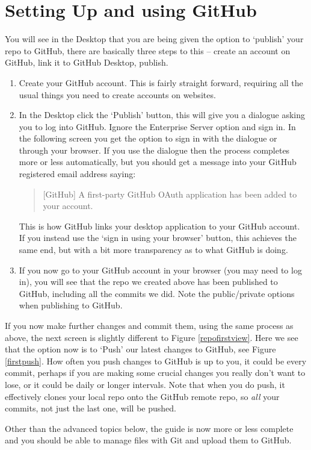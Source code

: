 \documentclass[a4paper, 12pt]{article}
\begin{document}
\section{Setting Up and using GitHub}
You will see in the Desktop that you are being given the option to `publish' your repo to GitHub, there are basically three steps to this -- create an account on GitHub, link it to GitHub Desktop, publish.
\begin{enumerate}
\item Create your GitHub account. This is fairly straight forward, requiring all the usual things you need to create accounts on websites.
\item In the Desktop click the `Publish' button, this will give you a dialogue asking you to log into GitHub. Ignore the Enterprise Server option and sign in. In the following screen you get the option to sign in with the dialogue or through your browser. If you use the dialogue then the process completes more or less automatically, but you should get a message into your GitHub registered email address saying:
\begin{quote}
[GitHub] A first-party GitHub OAuth application has been added to your account.
\end{quote}
This is how GitHub links your desktop application to your GitHub account. If you instead use the `sign in using your browser' button, this achieves the same end, but with a bit more transparency as to what GitHub is doing.
\item If you now go to your GitHub account in your browser (you may need to log in), you will see that the repo we created above has been published to GitHub, including all the commits we did. Note the public/private options when publishing to GitHub.
\end{enumerate}
If you now make further changes and commit them, using the same process as above, the next screen is slightly different to Figure \ref{repofirstview}. Here we see that the option now is to `Push' our latest changes to GitHub, see Figure \ref{firstpush}. How often you push changes to GitHub is up to you, it could be every commit, perhaps if you are making some crucial changes you really don't want to lose, or it could be daily or longer intervals. Note that when you do push, it effectively clones your local repo onto the GitHub remote repo, so \textit{all} your commits, not just the last one, will be pushed.

Other than the advanced topics below, the guide is now more or less complete and you should be able to manage files with Git and upload them to GitHub.
\end{document}
